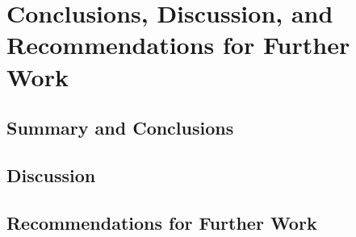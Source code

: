 \chapter[Conclusions]{Conclusions, Discussion, and Recommendations for Further Work}

\section{Summary and Conclusions}

\section{Discussion}
\section{Recommendations for Further Work}
